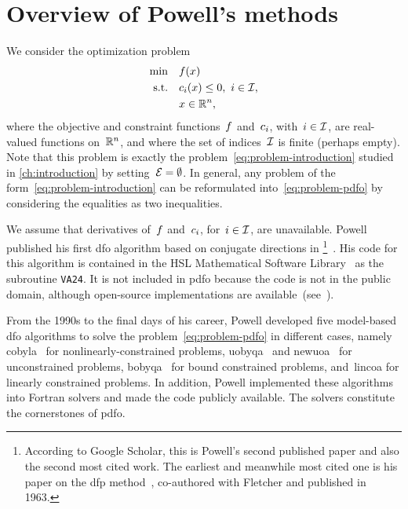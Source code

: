 \section{Overview of Powell's  methods}
\label{sec:powell}

We consider the optimization problem
\begin{subequations}
    \label{eq:problem-pdfo}
    \begin{align}
        \min        & \quad \obj(\iter)\\
        \text{s.t.} & \quad \con{i}(\iter) \le 0, ~ i \in \iub,\\
                    & \quad \iter \in \R^n, \nonumber
    \end{align}
\end{subequations}
where the objective and constraint functions~$f$ and~$c_{i}$, with~$i \in \mathcal{I}$, are real-valued functions on~$\mathbb{R}^n$, and where the set of indices~$\mathcal{I}$ is finite (perhaps empty).
Note that this problem is exactly the problem~\cref{eq:problem-introduction} studied in \cref{ch:introduction} by setting~$\mathcal{E} = \emptyset$.
In general, any problem of the form~\cref{eq:problem-introduction} can be reformulated into~\cref{eq:problem-pdfo} by considering the equalities as two inequalities.

We assume that derivatives of~$f$ and~$c_{i}$, for~$i \in \mathcal{I}$, are unavailable.
Powell published his first \gls{dfo} algorithm based on conjugate directions in \citeyear{Powell_1964}\footnote{According to Google Scholar, this is Powell's second published paper and also the second most cited work. The earliest and meanwhile most cited one is his paper on the \gls{dfp} method~\cite{Fletcher_Powell_1963}, co-authored with Fletcher and published in 1963.}~\cite{Powell_1964}.
His code for this algorithm is contained in the HSL Mathematical Software Library~\cite{HSL} as the subroutine \texttt{VA24}.
It is not included in \gls{pdfo} because the code is not in the public domain, although open-source implementations are available~(see~\cite[Fn.~4]{Conn_Scheinberg_Toint_1997b}).

From the 1990s to the final days of his career, Powell developed five model-based \gls{dfo} algorithms to solve the problem~\cref{eq:problem-pdfo} in different cases, namely \gls{cobyla}~\cite{Powell_1994} for nonlinearly-constrained problems, \gls{uobyqa}~\cite{Powell_2002} and \gls{newuoa}~\cite{Powell_2006} for unconstrained problems, \gls{bobyqa}~\cite{Powell_2009} for bound constrained problems, and~\gls{lincoa} for linearly constrained problems.
In addition, Powell implemented these algorithms into Fortran solvers and made the code publicly available.
The solvers constitute the cornerstones of \gls{pdfo}.

